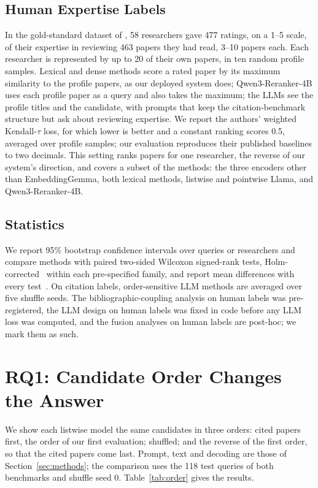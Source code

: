 \documentclass[sigconf,nonacm]{acmart}
\begin{document}
\subsection{Human Expertise Labels}
\label{sec:human-labels}
In the gold-standard dataset of \citet{stelmakh2025gold}, 58 researchers gave 477 ratings, on a 1--5 scale, of their expertise in reviewing 463 papers they had read, 3--10 papers each.
Each researcher is represented by up to 20 of their own papers, in ten random profile samples.
Lexical and dense methods score a rated paper by its maximum similarity to the profile papers, as our deployed system does; Qwen3-Reranker-4B uses each profile paper as a query and also takes the maximum; the LLMs see the profile titles and the candidate, with prompts that keep the citation-benchmark structure but ask about reviewing expertise.
We report the authors' weighted Kendall-$\tau$ loss, for which lower is better and a constant ranking scores 0.5, averaged over profile samples; our evaluation reproduces their published baselines to two decimals.
This setting ranks papers for one researcher, the reverse of our system's direction, and covers a subset of the methods: the three encoders other than EmbeddingGemma, both lexical methods, listwise and pointwise Llama, and Qwen3-Reranker-4B.

\subsection{Statistics}
\label{sec:stats}
We report 95\% bootstrap confidence intervals over queries or researchers and compare methods with paired two-sided Wilcoxon signed-rank tests, Holm-corrected~\citep{holm1979simple} within each pre-specified family, and report mean differences with every test~\citep{sakai2016significance}.
On citation labels, order-sensitive LLM methods are averaged over five shuffle seeds.
The bibliographic-coupling analysis on human labels was pre-registered, the LLM design on human labels was fixed in code before any LLM loss was computed, and the fusion analyses on human labels are post-hoc; we mark them as such.

\section{RQ1: Candidate Order Changes the Answer}
\label{sec:rq1}
We show each listwise model the same candidates in three orders: cited papers first, the order of our first evaluation; shuffled; and the reverse of the first order, so that the cited papers come last.
Prompt, text and decoding are those of Section~\ref{sec:methods}; the comparison uses the 118 test queries of both benchmarks and shuffle seed 0.
Table~\ref{tab:order} gives the results.
\end{document}
